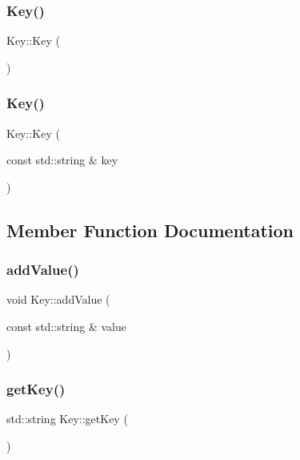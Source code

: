 \subsubsection{\texorpdfstring{Key()}{Key()}\hspace{0.1cm}{\footnotesize\ttfamily [1/2]}}
{\footnotesize\ttfamily Key\+::\+Key (\begin{DoxyParamCaption}{ }\end{DoxyParamCaption})}

\mbox{\label{struct_key_abc4ba925a8a8d807ae9671a058e4fd9d}} 
\subsubsection{\texorpdfstring{Key()}{Key()}\hspace{0.1cm}{\footnotesize\ttfamily [2/2]}}
{\footnotesize\ttfamily Key\+::\+Key (\begin{DoxyParamCaption}\item[{const std\+::string \&}]{key }\end{DoxyParamCaption})\hspace{0.3cm}{\ttfamily [explicit]}}



\subsection{Member Function Documentation}
\mbox{\label{struct_key_a8818b63b35d22713f32dc52a17c9b9a4}} 
\subsubsection{\texorpdfstring{add\+Value()}{addValue()}}
{\footnotesize\ttfamily void Key\+::add\+Value (\begin{DoxyParamCaption}\item[{const std\+::string \&}]{value }\end{DoxyParamCaption})}

\mbox{\label{struct_key_a7a1b140dc635e6227516e8abdecba16c}} 
\subsubsection{\texorpdfstring{get\+Key()}{getKey()}}
{\footnotesize\ttfamily std\+::string Key\+::get\+Key (\begin{DoxyParamCaption}{ }\end{DoxyParamCaption})}


